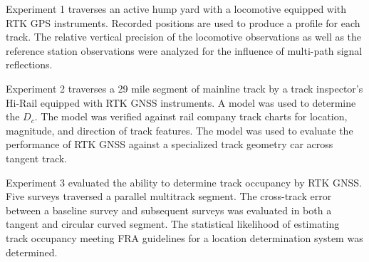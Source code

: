 Experiment 1 traverses an active hump yard with a locomotive equipped with RTK GPS instruments. Recorded positions are used to produce a profile for each track. The relative vertical precision of the locomotive observations as well as the reference station observations were analyzed for the influence of multi-path signal reflections.

Experiment 2 traverses a 29 mile segment of mainline track by a track inspector's Hi-Rail equipped with RTK GNSS instruments. A model was used to determine the ${D_c}$. The model was verified against rail company track charts for location, magnitude, and direction of track features. The model was used to 	evaluate the performance of RTK GNSS against a specialized track geometry car across tangent track.

Experiment 3 evaluated the ability to determine track occupancy by RTK GNSS. Five surveys traversed a parallel multitrack segment. The cross-track error between a baseline survey and subsequent surveys was evaluated in both a tangent and circular curved segment. The statistical likelihood of estimating track occupancy meeting FRA guidelines for a location determination system was determined.